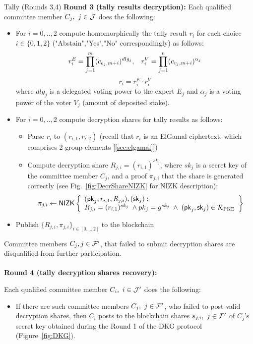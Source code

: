 \begin{boxfig}{\label{fig:tally2}Tally (Rounds 3,4)}{}
\textbf{Round 3 (tally results decryption):}
Each qualified committee member $C_j,\ j\in\JJJ$ does the following:
\begin{itemize}
    \item For $i = 0,..,2$ compute homomorphically the tally result $r_i$ for each choice $i\in\{0,1,2\}$ ("Abstain","Yes","No" correspondingly) as follows:
    \[r_i^E=\prod_{j=1}^{m} (c_{e_j,m+i})^{dlg_j},\hspace*{3mm} r_i^V=\prod_{j=1}^{n} (c_{v_j,m+i})^{\alpha_j}\]
    \[r_i=r_i^E \cdot r_i^V\]
    where $dlg_j$ is a delegated voting power to the expert $E_j$ and $\alpha_j$ is a voting power of the voter $V_j$ (amount of deposited stake). 
    \item For $i = 0,.., 2$ compute decryption shares for tally results as follows:
    \begin{itemize}
        \item Parse $r_i$ to $(r_{i,1}, r_{i,2})$ (recall that $r_{i}$ is an ElGamal ciphertext, which comprises 2 group elements [\ref{sec:elgamal}])
        \item Compute decryption share $R_{j,i}=(r_{i,1})^{sk_j}$, where $sk_j$ is a secret key of the committee member $C_j$, and a proof $\pi_{j,i}$ that the share is generated correctly (see Fig.~\ref{fig:DecrShareNIZK} for NIZK description):
        \begin{equation*}
        \pi_{j,i}\leftarrow\mathsf{NIZK}\left\{\begin{array}{l} (\mathsf{pk}_j, r_{i,1}, R_{j,i}),(\mathsf{sk}_j): \\
         R_{j,i}=(r_{i,1})^{sk_j} \; \wedge pk_j=g^{sk_j} \; \wedge \;  (\mathsf{pk}_j,\mathsf{sk}_j)\in\mathcal{R}_{\textsc{PKE}} \end{array}\right\}
        \end{equation*}
    \end{itemize}
    \item Publish $\{R_{j,i}, \pi_{j,i}\}_{i \in [0,..,2]}$ to the blockchain
\end{itemize}
Committee members $C_j, j \in \mathcal{F}'$, that failed to submit decryption shares are disqualified from further participation.
\\~\\
\textbf{Round 4 (tally decryption shares recovery):}

Each qualified committee member $C_i,\ i \in \mathcal{J}'$ does the following:
\begin{itemize}
    \item If there are such committee members $C_j,\ j \in \mathcal{F}'$, who failed to post valid decryption shares, then $C_i$ posts to the blockchain shares $s_{j,i},\ j \in \mathcal{F}'$ of $C_j$'s secret key obtained during the Round 1 of the DKG protocol (Figure~\ref{fig:DKG}).
\end{itemize}


\end{boxfig}
